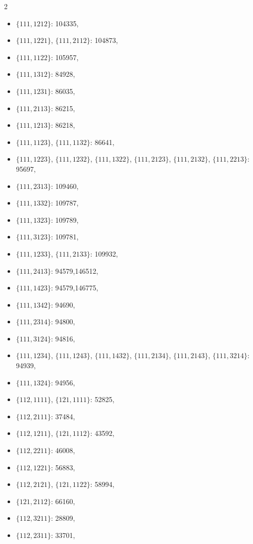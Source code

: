 \documentclass[11pt]{amsart}
\theoremstyle{plain}
\theoremstyle{definition}
\begin{document}
{%
\begin{multicols}{2}
\begin{itemize}
\item $\{111,1212\}$: 104335,
\item[$\blacksquare$] $\{111,1221\}$, $\{111,2112\}$: 104873,
\item $\{111,1122\}$: 105957,
\item $\{111,1312\}$: 84928,
\item $\{111,1231\}$: 86035,
\item $\{111,2113\}$: 86215,
\item $\{111,1213\}$: 86218,
\item[$\blacksquare$] $\{111,1123\}$, $\{111,1132\}$: 86641,
\item[$\blacksquare$] {$\{111,1223\}$, $\{111,1232\}$, $\{111,1322\}$, $\{111,2123\}$, $\{111,2132\}$, $\{111,2213\}$}: 95697,
\item $\{111,2313\}$: 109460,
\item $\{111,1332\}$: 109787,
\item $\{111,1323\}$: 109789,
\item $\{111,3123\}$: 109781,
\item[$\blacksquare$] {$\{111,1233\}$, $\{111,2133\}$}: 109932,
\item $\{111,2413\}$: 94579,146512,
\item $\{111,1423\}$: 94579,146775,
\item $\{111,1342\}$: 94690,
\item $\{111,2314\}$: 94800,
\item $\{111,3124\}$: 94816,
\item[$\blacksquare$] {$\{111,1234\}$, $\{111,1243\}$, $\{111,1432\}$, $\{111,2134\}$, $\{111,2143\}$, $\{111,3214\}$}: 94939,
\item $\{111,1324\}$: 94956,
\item[$\blacksquare$] {$\{112,1111\}$, $\{121,1111\}$}: 52825,
\item $\{112,2111\}$: 37484,
\item[$\blacksquare$] {$\{112,1211\}$, $\{121,1112\}$}: 43592,
\item $\{112,2211\}$: 46008,
\item $\{112,1221\}$: 56883,
\item[$\blacksquare$] {$\{112,2121\}$, $\{121,1122\}$}: 58994,
\item $\{121,2112\}$: 66160,
\item $\{112,3211\}$: 28809,
\item $\{112,2311\}$: 33701,

\end{itemize}
\end{multicols}}
\end{document}
